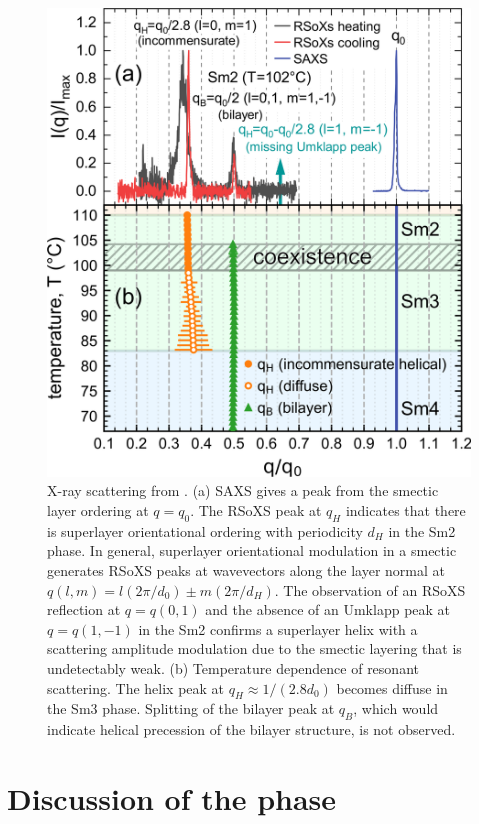 \documentclass[aagreenthesis]{subfiles}
\begin{document}
\begin{figure}[h!]
    \centering
    \includegraphics[width=.4\textwidth]{figs/pal30/rsoxssm2/xray-combined.png}
    \caption{\label{fig:pal30-xray-combined}X-ray scattering from .
            (a) SAXS gives a peak from the smectic layer ordering at $q=q_0$.
                The RSoXS peak at $q_H$ indicates that there is superlayer
            orientational ordering with periodicity $d_H$
                in the Sm2 phase.
                    In general, superlayer orientational modulation in a smectic
                generates RSoXS peaks at wavevectors along the layer normal at
                    $q(l,m) = l(2\pi/d_0) \pm
                m(2\pi/d_H)$\cite{levelut1999tensorial}.  The
                    observation of an RSoXS reflection at $q = q(0,1)$ and the
                absence of an Umklapp peak at $q = q(1,-1)$  in
                    the Sm2 confirms a superlayer helix with a scattering
                amplitude
                    modulation due to the smectic layering that is undetectably
                weak.
                    (b) Temperature dependence of resonant scattering. The helix
                peak at $q_H \approx1/(2.8 d_0)$ becomes diffuse in the Sm3
            phase. Splitting
                of the bilayer peak at $q_B$, which would indicate helical
            precession of the bilayer structure, is not observed.}
\end{figure}


\section{Discussion of the \smcpalpha{} phase}

%
\biblio
\end{document}
